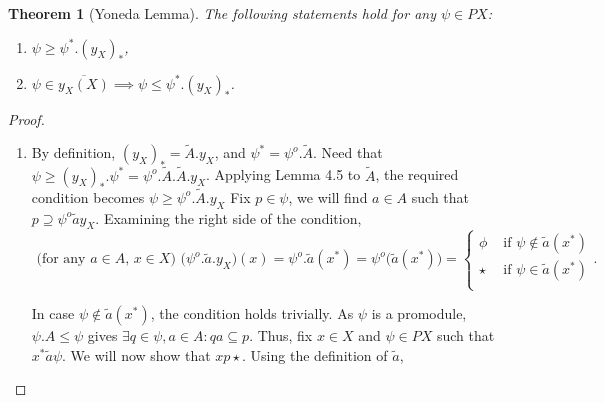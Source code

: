 \documentclass[a4paper]{article}
\newtheorem{theorem}{Theorem}[section]
\theoremstyle{definition}
\begin{document}
\begin{theorem}[Yoneda Lemma] %
	The following statements hold for any $\psi \in PX$:
	\begin{enumerate}[label=(\alph*)]
		\item $\psi \geq \psi^*.(y_X)_*$,
		\item $\psi \in \overline{y_X(X)} \implies \psi \leq \psi^*.(y_X)_*$.
	\end{enumerate}
\end{theorem}
\begin{proof}\setcounter{equation}{0}
	\begin{enumerate}[label=(\alph*)]
		\item By definition, $(y_X)_*=\tilde{A}.y_X$, and $\psi^*=\psi^o.\tilde{A}$. Need that
			$\psi \geq (y_X)_*.\psi^* = \psi^o.\tilde{A}.\tilde{A}.y_X$.
			Applying Lemma 4.5 to
			$\tilde{A}$, the required condition becomes $\psi \geq \psi^o .\tilde{A} .y_X$
			Fix $p \in \psi$,
			we will find $a \in A$ such that $p \supseteq \psi^o \tilde{a} y_X$. Examining the right side of the condition,
			\begin{equation}
				\text{ (for any $a \in A$, $x \in X$) } \Big(\psi^o.\tilde{a} .y_X \Big) (x) = \psi^o.\tilde{a} (x^*)=
				\psi^o\big(\tilde{a}(x^*)\big)= \begin{cases}
					\phi &\text{ if } \psi \notin \tilde{a} (x^*) \\
					\star &\text{ if } \psi \in \tilde{a} (x^*) \\

				\end{cases}.\end{equation}

				In case $\psi \notin \tilde{a} (x^*)$, the condition holds trivially. As $\psi$ is a
				promodule, $\psi.A\leq \psi$ gives $\exists q\in \psi, a
				\in A: qa \subseteq p$. Thus, fix $x\in X$ and	$\psi \in PX$ such that
				$x^* \tilde{a} \psi $. We will now show that $xp\star$. Using the definition of $\tilde{a}$,


\end{enumerate}
\end{proof}
\end{document}
